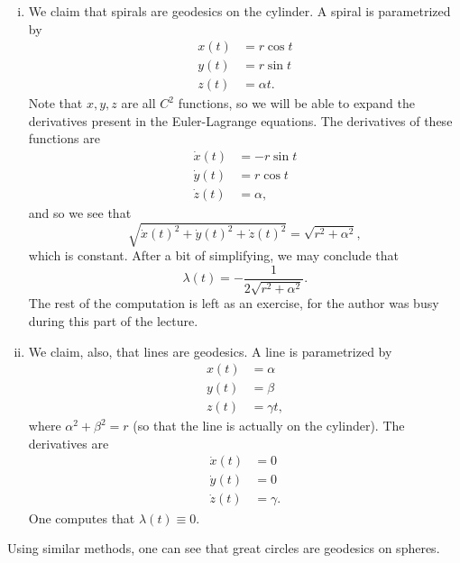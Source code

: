 \documentclass[11pt]{book}
\begin{document}
\begin{enumerate}
\begin{enumerate}[(i)]
\item
We claim that spirals are geodesics on the cylinder. A spiral is parametrized by
\begin{align*}
x(t) &= r \cos t \\
y(t) &= r \sin t \\
z(t) &= \alpha t.
\end{align*}
Note that $x, y, z$ are all $C^2$ functions, so we will be able to expand the derivatives present in the Euler-Lagrange equations. The derivatives of these functions are
\begin{align*}
\dot{x}(t) &= -r \sin t \\
\dot{y}(t) &= r \cos t \\
\dot{z}(t) &= \alpha,
\end{align*}
and so we see that
\[
\sqrt{\dot{x}(t)^2 + \dot{y}(t)^2 + \dot{z}(t)^2} = \sqrt{r^2 + \alpha^2},
\]
which is constant. After a bit of simplifying, we may conclude that
\[
\lambda(t) = -\frac{1}{2\sqrt{r^2 + \alpha^2}}.
\]
The rest of the computation is left as an exercise, for the author was busy during this part of the lecture.

\item
We claim, also, that lines are geodesics. A line is parametrized by
\begin{align*}
x(t) &= \alpha \\
y(t) &= \beta \\
z(t) &= \gamma t,
\end{align*}
where $\alpha^2 + \beta^2 = r$ (so that the line is actually on the cylinder). The derivatives are
\begin{align*}
\dot{x}(t) &= 0 \\
\dot{y}(t) &= 0 \\
\dot{z}(t) &= \gamma.
\end{align*}
One computes that $\lambda(t) \equiv 0.$
\end{enumerate}
Using similar methods, one can see that great circles are geodesics on spheres.


\end{enumerate}
\end{document}
